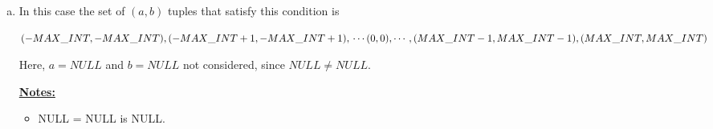 \documentclass[12pt]{article}
\begin{document}
\begin{enumerate}[1.]
\begin{enumerate}[a)]
\begin{enumerate}[i.]
            \bigskip

            $(MAX\_INT - 1, -MAX\_INT), (MAX\_INT - 1,-MAX\_INT + 1), \\
            \cdots (MAX\_INT - 1,0), \cdots, (MAX\_INT - 1,MAX\_INT - 1), \\
            (MAX\_INT - 1,MAX\_INT), (MAX\_INT - 1, NULL)$

            \bigskip

            $(MAX\_INT, -MAX\_INT), (MAX\_INT,-MAX\_INT + 1), \\
            \cdots (MAX\_INT,0), \cdots, (MAX\_INT,MAX\_INT - 1), \\
            (MAX\_INT,MAX\_INT), (MAX\_INT, NULL)$

            \item $a < 10$ AND $a >= 10$

            \bigskip

            This case is not considered. No $(a,b)$ tuples match this condition.
        \end{enumerate}

        \item

        \bigskip

        In this case the set of $(a,b)$ tuples that satisfy this condition is

        \bigskip

        $(-MAX\_INT, -MAX\_INT), (-MAX\_INT + 1,-MAX\_INT + 1), \\
        \cdots (0,0), \cdots, (MAX\_INT - 1,MAX\_INT - 1),\\
        (MAX\_INT,MAX\_INT)$

        \bigskip

        Here, $a = NULL$ and $b = NULL$ not considered, since $NULL \neq NULL$.

        \bigskip

        \underline{\textbf{Notes:}}

        \bigskip

        \begin{itemize}
            \item NULL = NULL is NULL.
        \end{itemize}
    \end{enumerate}
\end{enumerate}
\end{document}
